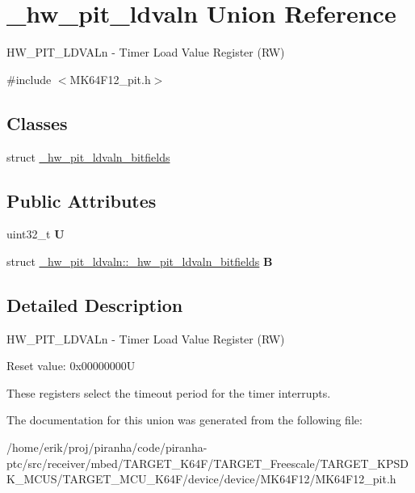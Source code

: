 \hypertarget{union__hw__pit__ldvaln}{}\section{\+\_\+hw\+\_\+pit\+\_\+ldvaln Union Reference}
\label{union__hw__pit__ldvaln}


H\+W\+\_\+\+P\+I\+T\+\_\+\+L\+D\+V\+A\+Ln -\/ Timer Load Value Register (RW)  




{\ttfamily \#include $<$M\+K64\+F12\+\_\+pit.\+h$>$}

\subsection*{Classes}
\begin{DoxyCompactItemize}
\item 
struct \hyperlink{struct__hw__pit__ldvaln_1_1__hw__pit__ldvaln__bitfields}{\+\_\+hw\+\_\+pit\+\_\+ldvaln\+\_\+bitfields}
\end{DoxyCompactItemize}
\subsection*{Public Attributes}
\begin{DoxyCompactItemize}
\item 
uint32\+\_\+t {\bfseries U}\hypertarget{union__hw__pit__ldvaln_a8af91b70ab36b5a66c643823e75f5aa8}{}\label{union__hw__pit__ldvaln_a8af91b70ab36b5a66c643823e75f5aa8}

\item 
struct \hyperlink{struct__hw__pit__ldvaln_1_1__hw__pit__ldvaln__bitfields}{\+\_\+hw\+\_\+pit\+\_\+ldvaln\+::\+\_\+hw\+\_\+pit\+\_\+ldvaln\+\_\+bitfields} {\bfseries B}\hypertarget{union__hw__pit__ldvaln_a6c2d33439d5e4c570f5ccefa7ea01ec4}{}\label{union__hw__pit__ldvaln_a6c2d33439d5e4c570f5ccefa7ea01ec4}

\end{DoxyCompactItemize}


\subsection{Detailed Description}
H\+W\+\_\+\+P\+I\+T\+\_\+\+L\+D\+V\+A\+Ln -\/ Timer Load Value Register (RW) 

Reset value\+: 0x00000000U

These registers select the timeout period for the timer interrupts. 

The documentation for this union was generated from the following file\+:\begin{DoxyCompactItemize}
\item 
/home/erik/proj/piranha/code/piranha-\/ptc/src/receiver/mbed/\+T\+A\+R\+G\+E\+T\+\_\+\+K64\+F/\+T\+A\+R\+G\+E\+T\+\_\+\+Freescale/\+T\+A\+R\+G\+E\+T\+\_\+\+K\+P\+S\+D\+K\+\_\+\+M\+C\+U\+S/\+T\+A\+R\+G\+E\+T\+\_\+\+M\+C\+U\+\_\+\+K64\+F/device/device/\+M\+K64\+F12/M\+K64\+F12\+\_\+pit.\+h\end{DoxyCompactItemize}
